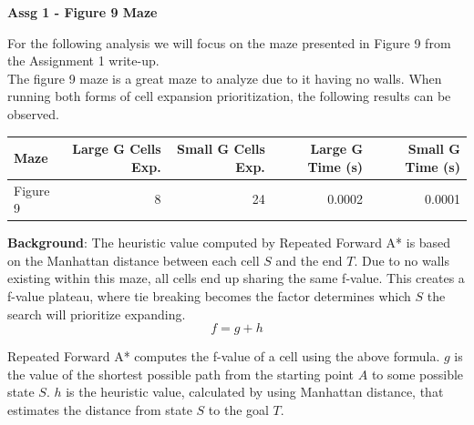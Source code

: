 \documentclass{article}
\begin{document}
\noindent \begin{center}

\textbf{Assg 1 - Figure 9 Maze}
\end{center}

\noindent
For the following analysis we will focus on the maze presented in Figure 9 from the Assignment 1 write-up.
\\

\noindent The figure 9 maze is a great maze to analyze due to it having no walls. When running both forms of cell expansion prioritization, the following results can be observed. 

\begin{center}
\begin{tabular}{|l|r|r|r|r|}
\hline
\textbf{Maze} & \textbf{Large G Cells Exp.} & \textbf{Small G Cells Exp.} & \textbf{Large G Time (s)} & \textbf{Small G Time (s)} \\
\hline
Figure 9 & 8 & 24 & 0.0002 & 0.0001 \\
\hline
\end{tabular}
\end{center}

\noindent \textbf{Background}: The heuristic value computed by Repeated Forward A* is based on the Manhattan distance between each cell $S$ and the end $T$. Due to no walls existing within this maze, all cells end up sharing the same f-value. This creates a f-value plateau, where tie breaking becomes the factor determines which $S$ the search will prioritize expanding.
\[ f = g + h\]

\noindent Repeated Forward A* computes the f-value of a cell using the above formula. $g$ is the value of the shortest possible path from the starting point $A$ to some possible state $S$. $h$ is the heuristic value, calculated by using Manhattan distance, that estimates the distance from state $S$ to the goal $T$. \\
\end{document}
